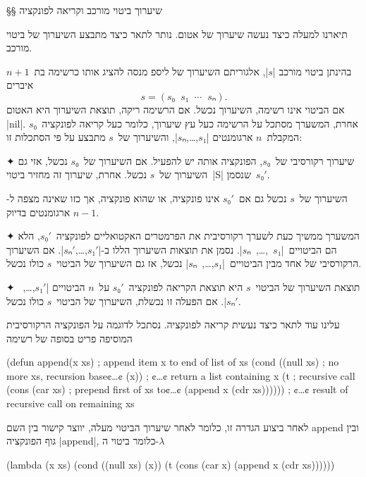 \eject
§§ שיערוך ביטוי מורכב וקריאה לפונקציה

תיארנו למעלה כיצד נעשה שיערוך של אטום. נותר לתאר כיצד מתבצע השיערוך של ביטוי
מורכב.

\minipage\textwidth
\begin{mdframed}[backgroundcolor=Lavender!20]
  בהינתן ביטוי מורכב \E|$s$|, אלגוריתם השיערוך של ליספ מנסה
  להציג אותו כרשימה בת~$n+1$ איברים \[
    s=(s₀\;\;s₁\;\;⋯\;\;sₙ).
  \] אם הביטוי אינו רשימה, השיערוך נכשל. אם הרשימה ריקה, תוצאת השיערוך היא האטום
  \T|nil|. אחרת, המשערך מסתכל על הרשימה כעל עץ שיערוך, כלומר כעל קריאה
  לפונקציה~$s₀$ המקבלת~$n$ ארגומנטים \E|$s₁$,…,$sₙ$|, והשיערוך
  של~$s$ מתבצע על פי הסתכלות זו:
  \begin{enumerate}
    ✦ שיערוך רקורסיבי של~$s₀$, הפונקציה אותה יש להפעיל. אם השיערוך של~$s₀$ נכשל,
    אזי גם השיערוך של~$s$ נכשל. אחרת, שיערוך זה מחזיר ביטוי~\E|S| שנסמן~$s₀'$.

    השיערוך של~$s$ נכשל גם אם~$s₀'$ אינו פונקציה, או שהוא פונקציה, אך כזו שאינה
    מצפה ל-$n-1$ ארגומנטים בדיוק.

    ✦ המשערך ממשיך כעת לשערך רקורסיבית את הפרמטרים האקטואליים לפונקציה~$s₀'$,
    הלא הם הביטויים~\E|$s₁$~,…,~$sₙ$|. נסמן את תוצאות השיערוך הללו
    ב-\E|$s₁'$,…,$sₙ'$|. אם השיערוך הרקורסיבי של אחד מבין
    הביטויים~\E|$s₁$,…,~$sₙ$| נכשל, אז גם השיערוך של הביטוי~$s$
    כולו נכשל.

    ✦ תוצאת השיערוך של הביטוי~$s$ היא תוצאת הקריאה לפונקציה~$s₀'$ על~$n$ הביטויים
    \E|$s₁'$,…,~$sₙ'$|. אם הפעלה זו נכשלת, השיערוך של הביטוי~$s$ כולו נכשל.
  \end{enumerate}
\end{mdframed}
\endminipage

עלינו עוד לתאר כיצד נעשית קריאה לפונקציה. נסתכל לדוגמה על הפונקציה הרקורסיבית
המוסיפה פריט בסופה של רשימה
\begin{LISP}
(defun append(x xs) ; append item x to end of list of xs
  (cond ((null xs) ; no more xs, recursion base¢…¢
          (x)) ; ¢…¢ return a list containing x
        (t ; recursive call
          (cons
            (car xs) ; prepend first of xs to¢…¢
            (append x (cdr xs)))))) ; ¢…¢ result of recursive call on remaining xs
\end{LISP}

\minipage\textwidth
לאחר ביצוע הגדרה זו, כלומר לאחר שיערוך הביטוי מעלה, יווצר קישור בין השם append
ובין גוף הפונקציה \E|append|, כלומר ביטוי ה-$λ$
\begin{LISP}
(lambda (x xs)
  (cond ((null xs) (x))
        (t (cons
              (car x)
              (append x (cdr xs))))))
\end{LISP}
\endminipage

